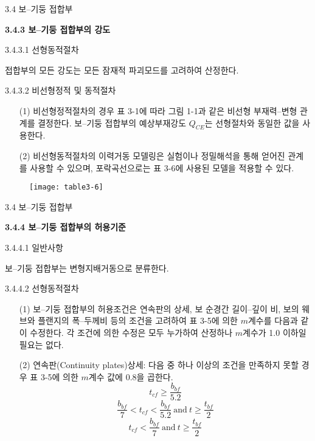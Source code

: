 \begin{frame}{3.4 보--기둥 접합부}

	\textbf{3.4.3 보--기둥 접합부의 강도}

3.4.3.1 선형동적절차

접합부의 모든 강도는 모든 잠재적 파괴모드를 고려하여 산정한다. 

3.4.3.2 비선형정적 및 동적절차

\begin{enumerate}
	\item[(1)] 비선형정적절차의 경우 표 3-1에 따라 그림 1-1과 같은 비선형 부재력--변형 관계를 결정한다. 보--기둥 접합부의 예상부재강도 $Q_{CE}$는 선형절차와 동일한 값을 사용한다. 
	\item[(2)] 비선형동적절차의 이력거동 모델링은 실험이나 정밀해석을 통해 얻어진 관계를 사용할 수 있으며, 포락곡선으로는 표 3-6에 사용된 모델을 적용할 수 있다. 
\end{enumerate}
\end{frame}	



\begin{frame}
	\begin{figure}
		\centering
		\texttt{[image: table3-6]}
	\end{figure}
\end{frame}	




	\begin{frame}{3.4 보--기둥 접합부}

	\textbf{3.4.4 보--기둥 접합부의 허용기준}

3.4.4.1 일반사항

보--기둥 접합부는 변형지배거동으로 분류한다. 

3.4.4.2 선형동적절차

\begin{enumerate}
	\item[(1)] 보--기둥 접합부의 허용조건은 연속판의 상세, 보 순경간 길이--깊이 비, 보의 웨브와 플랜지의 폭--두께비 등의 조건을 고려하여 표 3-5에 의한 $m$계수를 다음과 같이 수정한다. 각 조건에 의한 수정은 모두 누가하여 산정하나 $m$계수가 1.0 이하일 필요는 없다. 
	\item[(2)] 연속판(Continuity plates)상세: 다음 중 하나 이상의 조건을 만족하지 못할 경우 표 3-5에 의한 $m$계수 값에 0.8을 곱한다. 
			\[t_{cf} \geq \frac{b_{bf}}{5.2}\]
			\[\frac{b_{bf}}{7}<t_{cf}<\frac{b_{bf}}{5.2}~\mathrm{and}~t\geq\frac{t_{bf}}{2}\]
			\[t_{cf}<\frac{b_{bf}}{7}~\mathrm{and}~t\geq\frac{t_{bf}}{2}\]
\end{enumerate}

	\end{frame}
	
